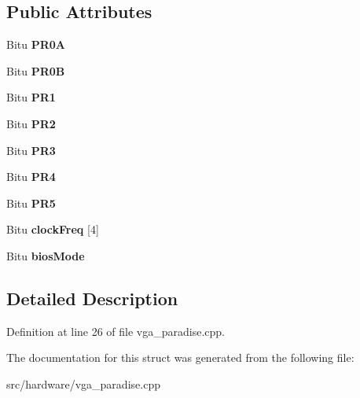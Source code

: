 \subsection*{Public Attributes}
\begin{DoxyCompactItemize}
\item 
\hypertarget{structSVGA__PVGA1A__DATA__t_ab788c8b18c43b50fd4d97ffa275d0948}{Bitu {\bfseries P\-R0\-A}}\label{structSVGA__PVGA1A__DATA__t_ab788c8b18c43b50fd4d97ffa275d0948}

\item 
\hypertarget{structSVGA__PVGA1A__DATA__t_acc8685cf527e8a5d575bba7f19e8fbe5}{Bitu {\bfseries P\-R0\-B}}\label{structSVGA__PVGA1A__DATA__t_acc8685cf527e8a5d575bba7f19e8fbe5}

\item 
\hypertarget{structSVGA__PVGA1A__DATA__t_a078e4007dfdd9d01acfc8849cb7e96ca}{Bitu {\bfseries P\-R1}}\label{structSVGA__PVGA1A__DATA__t_a078e4007dfdd9d01acfc8849cb7e96ca}

\item 
\hypertarget{structSVGA__PVGA1A__DATA__t_aa8f51bbeb9eec6f6af10e82bcb9e763d}{Bitu {\bfseries P\-R2}}\label{structSVGA__PVGA1A__DATA__t_aa8f51bbeb9eec6f6af10e82bcb9e763d}

\item 
\hypertarget{structSVGA__PVGA1A__DATA__t_ae6214057c274c1b1c7209c2984f443c9}{Bitu {\bfseries P\-R3}}\label{structSVGA__PVGA1A__DATA__t_ae6214057c274c1b1c7209c2984f443c9}

\item 
\hypertarget{structSVGA__PVGA1A__DATA__t_a911a3539a9a928327a6c033dfd0d6ab3}{Bitu {\bfseries P\-R4}}\label{structSVGA__PVGA1A__DATA__t_a911a3539a9a928327a6c033dfd0d6ab3}

\item 
\hypertarget{structSVGA__PVGA1A__DATA__t_af129fd632585f7b0ca816254e06ad369}{Bitu {\bfseries P\-R5}}\label{structSVGA__PVGA1A__DATA__t_af129fd632585f7b0ca816254e06ad369}

\item 
\hypertarget{structSVGA__PVGA1A__DATA__t_a90cd5dbc19d1a89d74b6d19f92ef0685}{Bitu {\bfseries clock\-Freq} \mbox{[}4\mbox{]}}\label{structSVGA__PVGA1A__DATA__t_a90cd5dbc19d1a89d74b6d19f92ef0685}

\item 
\hypertarget{structSVGA__PVGA1A__DATA__t_a67a12f9b2e4fb47bd8544fad1fe6fcdb}{Bitu {\bfseries bios\-Mode}}\label{structSVGA__PVGA1A__DATA__t_a67a12f9b2e4fb47bd8544fad1fe6fcdb}

\end{DoxyCompactItemize}


\subsection{Detailed Description}


Definition at line 26 of file vga\-\_\-paradise.\-cpp.



The documentation for this struct was generated from the following file\-:\begin{DoxyCompactItemize}
\item 
src/hardware/vga\-\_\-paradise.\-cpp\end{DoxyCompactItemize}

